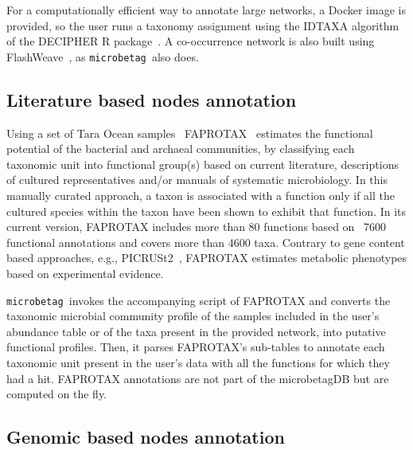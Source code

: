 \documentclass[sn-mathphys,Numbered]{sn-jnl}  %
\theoremstyle{thmstyleone}%
\theoremstyle{thmstyletwo}%
\theoremstyle{thmstylethree}%
\newcommand{\microbetag}{\texttt{microbetag }}
\begin{document}
        For a computationally efficient way to annotate large networks, a Docker image is provided, so the user runs a taxonomy assignment using the IDTAXA algorithm~\cite{murali2018idtaxa} of the DECIPHER R package~\cite{wright2016using}.
        A co-occurrence network is also built using FlashWeave~\cite{flashweave_cite}, as \microbetag also does.


    \subsection*{Literature based nodes annotation}
    \label{subsec:fapro}

        Using a set of Tara Ocean samples~\cite{sunagawa2015structure} FAPROTAX~\cite{louca2016decoupling} estimates the functional potential of the bacterial and archaeal communities, by classifying each taxonomic unit into functional group(s) based on current literature, descriptions of cultured representatives and/or manuals of systematic microbiology. 
        In this manually curated approach, a taxon is associated with a function only if all the cultured species within the taxon have been shown to exhibit that function. 
        In its current version, FAPROTAX includes more than 80 functions based on ~7600 functional annotations and covers more than 4600 taxa.
        Contrary to gene content based approaches, e.g., PICRUSt2~\cite{douglas2020picrust2}, FAPROTAX  estimates metabolic phenotypes based on experimental evidence. 

        \microbetag invokes the accompanying script of FAPROTAX and converts the taxonomic microbial community profile of the samples included in the user's abundance table or of the taxa present in the provided network, into putative functional profiles.
        Then, it parses FAPROTAX's sub-tables to annotate each taxonomic unit present in the user's data with all the functions for which they had a hit. 
        FAPROTAX annotations are not part of the microbetagDB but are computed on the fly.


    \subsection*{Genomic based nodes annotation}
    \label{subsec:phen}
\end{document}
